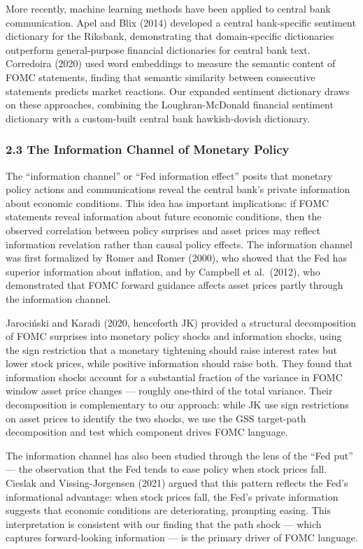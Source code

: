 \documentclass[
]{article}
\begin{document}
More recently, machine learning methods have been applied to central
bank communication. Apel and Blix (2014) developed a central
bank-specific sentiment dictionary for the Riksbank, demonstrating that
domain-specific dictionaries outperform general-purpose financial
dictionaries for central bank text. Corredoira (2020) used word
embeddings to measure the semantic content of FOMC statements, finding
that semantic similarity between consecutive statements predicts market
reactions. Our expanded sentiment dictionary draws on these approaches,
combining the Loughran-McDonald financial sentiment dictionary with a
custom-built central bank hawkish-dovish dictionary.

\subsubsection{2.3 The Information Channel of Monetary
Policy}\label{the-information-channel-of-monetary-policy}

The ``information channel'' or ``Fed information effect'' posits that
monetary policy actions and communications reveal the central bank's
private information about economic conditions. This idea has important
implications: if FOMC statements reveal information about future
economic conditions, then the observed correlation between policy
surprises and asset prices may reflect information revelation rather
than causal policy effects. The information channel was first formalized
by Romer and Romer (2000), who showed that the Fed has superior
information about inflation, and by Campbell et al.~(2012), who
demonstrated that FOMC forward guidance affects asset prices partly
through the information channel.

Jarociński and Karadi (2020, henceforth JK) provided a structural
decomposition of FOMC surprises into monetary policy shocks and
information shocks, using the sign restriction that a monetary
tightening should raise interest rates but lower stock prices, while
positive information should raise both. They found that information
shocks account for a substantial fraction of the variance in FOMC window
asset price changes --- roughly one-third of the total variance. Their
decomposition is complementary to our approach: while JK use sign
restrictions on asset prices to identify the two shocks, we use the GSS
target-path decomposition and test which component drives FOMC language.

The information channel has also been studied through the lens of the
``Fed put'' --- the observation that the Fed tends to ease policy when
stock prices fall. Cieslak and Vissing-Jorgensen (2021) argued that this
pattern reflects the Fed's informational advantage: when stock prices
fall, the Fed's private information suggests that economic conditions
are deteriorating, prompting easing. This interpretation is consistent
with our finding that the path shock --- which captures forward-looking
information --- is the primary driver of FOMC language.
\end{document}
